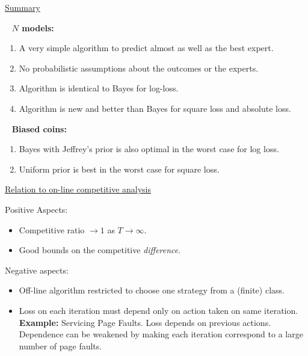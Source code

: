 \begin{flushleft}
\begin{LARGE}
\pagebreak
\begin{center}
\underline{Summary}
\end{center}
~\newline
{\bf $N$ models:} 
\begin{enumerate}
\item
A very simple algorithm to predict almost as well as the best expert.
\item
No probabilistic assumptions about the outcomes or the experts.
\item
Algorithm is identical to Bayes for log-loss.
\item
Algorithm is new and better than Bayes for square loss and absolute
loss.
\end{enumerate}
~\newline
{\bf Biased coins:} 
\begin{enumerate}
\item 
Bayes with Jeffrey's prior is also optimal in the
worst case for log loss.
\item
Uniform prior is best in the worst case for square loss.
\end{enumerate}
\pagebreak

\begin{center}
\underline{Relation to on-line competitive analysis}
\end{center}

Positive Aspects:
\begin{itemize}
\item
Competitive ratio $\to 1$ as $T \to \infty$.
\item
Good bounds on the competitive {\em difference}.
\end{itemize}

Negative aspects:
\begin{itemize}
\item
Off-line algorithm  restricted to choose one strategy
from a (finite) class.
\item
Loss on each iteration must depend only on action taken on same
iteration.\newline
{\bf Example:} Servicing Page Faults. Loss depends on previous
actions.\newline
Dependence can be weakened by making each 
iteration correspond to a large
number of page faults.
\end{itemize}
\pagebreak


\end{LARGE}
\end{flushleft}
